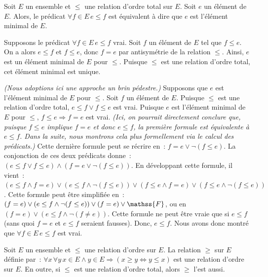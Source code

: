    \done 

\blank[medium]

\noindent{} Soit $E$ un ensemble et $\leq$ une relation d'ordre total sur $E$. 
    Soit $e$ un élément de $E$.
    Alors, le prédicat $\forall f \in E \, e \leq f$ est équivalent à dire que $e$ est l'élément minimal de $E$.

\blank[medium]

\noindent{}
\startitemize[nowhite]
    \item Supposons le prédicat $\forall f \in E \, e \leq f$ vrai. 
        Soit $f$ un élément de $E$ tel que $f \leq e$. 
        On a alors $e \leq f$ et $f \leq e$, donc $f = e$ par antisymétrie de la relation $\leq$. 
        Ainsi, $e$ est un élément minimal de $E$ pour $\leq$.
        Puisque $\leq$ est une relation d'ordre total, cet élément minimal est unique.
    \item \emph{(Nous adoptions ici une approche un brin pédestre.)} 
        Supposons que $e$ est l'élément minimal de $E$ pour $\leq$.
        Soit $f$ un élément de $E$. 
        Puisque $\leq$ est une relation d'ordre total, $e \leq f \vee f \leq e$ est vrai.
        Puisque $e$ est l'élément minimal de $E$ pour $\leq$, $f \leq e \Rightarrow f = e$ est vrai. 
        \emph{(Ici, on pourrait directement conclure que, puisque $f \leq e$ implique $f = e$ et donc $e \leq f$, la première formule est équivalente à $e \leq f$. Dans la suite, nous montrons cela plus formellement \emph{via} le calcul des prédicats.)}
        Cette dernière formule peut se récrire en : $f = e \vee \lnot (f \leq e)$.
        La conjonction de ces deux prédicats donne : $(e \leq f \vee f \leq e) \wedge (f = e \vee \lnot (f \leq e))$.
        En développant cette formule, il vient : $(e \leq f \wedge f = e) \vee (e \leq f \wedge \lnot (f \leq e)) \vee (f \leq e \wedge f = e) \vee (f \leq e \wedge \lnot (f \leq e))$.
        Cette formule peut être simplifiée en : $(f = e) \vee (e \leq f \wedge \lnot (f \leq e)) \vee (f = e) \vee \mathss{F}$, 
        ou en $(f = e) \vee (e \leq f \wedge \lnot (f \neq e))$.
        Cette formule ne peut être vraie que si $e \leq f$ (sans quoi $f = e$ et $e \leq f$ seraient fausses).
        Donc, $e \leq f$.
        Nous avons donc montré que $\forall f \in E \, e \leq f$ est vrai.
\stopitemize
    
   \done 

\blank[medium]

\noindent{} Soit $E$ un ensemble et $\leq$ une relation d'ordre sur $E$. 
    La relation $\geq$ sur $E$ définie par : $\forall x \, \forall y \, x \in E \wedge y \in E \Rightarrow (x \geq y \Leftrightarrow y \leq x)$ est une relation d'ordre sur $E$. 
    En outre, si $\leq$ est une relation d'ordre total, alors $\geq$ l'est aussi.

